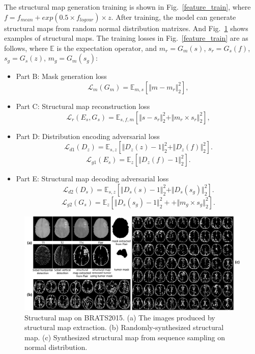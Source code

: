 \documentclass[runningheads]{llncs}
\begin{document}
	The structural map generation training is shown in Fig.~\ref{feature_train}, where $f=f_{mean}+exp(0.5\times f_{logvar})\times z$. After training, the model can generate structural maps from random normal distribution matrixes. And Fig.~\ref{generated_f} shows examples of structural maps. The training losses in Fig.~\ref{feature_train} are as follows, where $\mathbb{E}$ is the expectation operator, and $m_r=G_m(s)$, $s_r=G_s(f)$, $s_g=G_s(z)$, $m_g=G_m(s_g)$: 
	\begin{itemize}
		\item{Part B: Mask generation loss}
		\begin{equation}
		\mathcal{L}_{m}(G_m)=\mathbb{E}_{m,s}[\Vert{m-m_r}\Vert_{2}^{2}],
		\end{equation}
		\item{Part C: Structural map reconstruction loss} 
		\begin{equation}
		\mathcal{L}_{r}(E_s,G_s)=\mathbb{E}_{s,f,m}[\Vert{s-s_r}\Vert_{2}^{2}+\Vert{m_r\times s_r}\Vert_{2}^{2}],
		\end{equation}
		\item{Part D: Distribution encoding adversarial loss} 
		\begin{equation}
		\mathcal{L}_{d1}(D_{z})=\mathbb{E}_{s,z}[\Vert{D_{z}(z)-1}\Vert_{2}^{2}+\Vert{D_{z}(f)}\Vert_{2}^{2}].
		\end{equation}
		\begin{equation}
		\mathcal{L}_{g1}(E_s)=\mathbb{E}_{z}[\Vert{D_{z}(f)-1}\Vert_{2}^{2}].	
		\end{equation}
		\item{Part E: Structural map decoding adversarial loss} 
		\begin{equation}
		\mathcal{L}_{d2}(D_{s})=\mathbb{E}_{s,z}[\Vert{D_{s}(s)-1}\Vert_{2}^{2}+\Vert{D_{s}(s_g)}\Vert_{2}^{2}].
		\end{equation}
		\begin{equation}
		\mathcal{L}_{g2}(G_s)=\mathbb{E}_{z}[\Vert{D_{s}(s_g)-1}\Vert_{2}^{2}++\Vert{m_g\times s_g}\Vert_{2}^{2}].	
		\end{equation}
	\end{itemize}
	\begin{figure}[th]
		\centering
		\includegraphics[width=1\linewidth]{figures/brats_f}
		\caption{Structural map on BRATS2015. (a) The images produced by structural map extraction. (b) Randomly-synthesized structural map. (c) Synthesized structural map from sequence sampling on normal distribution.}
		\label{generated_f}
	\end{figure}
\end{document}
